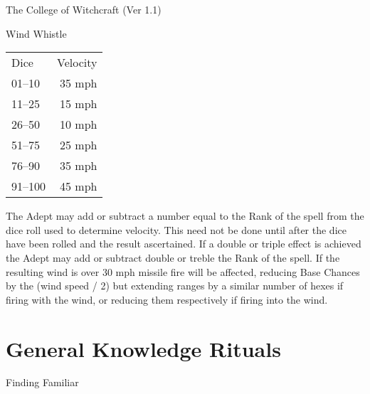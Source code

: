 \begin{Chapter}{The College of Witchcraft (Ver 1.1)}
\begin{spell}[G-13]{Wind Whistle}
\begin{effects}
\begin{tabularx}{\columnwidth}{lr}
Dice	& Velocity \\
01--10	& 35 mph \\
11--25	& 15 mph \\
26–50	& 10 mph \\
51–75	& 25 mph \\
76–90	& 35 mph \\
91–100	& 45 mph \\
\end{tabularx}
The Adept may add or subtract a number equal to the Rank of the spell
from the dice roll used to determine velocity.  This need not be done
until after the dice have been rolled and the result ascertained.  If
a double or triple effect is achieved the Adept may add or subtract
double or treble the Rank of the spell.  If the resulting wind is over
30 mph missile fire will be affected, reducing Base Chances by the
(wind speed / 2) but extending ranges by a similar number of hexes if
firing with the wind, or reducing them respectively if firing into the
wind.
\end{effects}
\end{spell}

\section{General Knowledge Rituals}

\begin{ritual}[Q-1]{Finding Familiar}


\end{ritual}
\end{Chapter}
